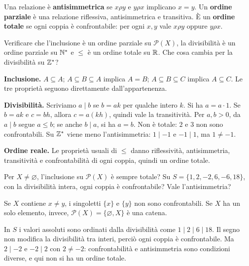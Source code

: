 \begin{definizione}
Una relazione è \textbf{antisimmetrica} se $x\rho y$ e $y\rho x$ implicano $x=y$. Un \textbf{ordine parziale} è una relazione riflessiva, antisimmetrica e transitiva. È un \textbf{ordine totale} se ogni coppia è confrontabile: per ogni $x,y$ vale $x\rho y$ oppure $y\rho x$.
\end{definizione}

\begin{esercizio}
Verificare che l'inclusione è un ordine parziale su $\mathcal P(X)$, la divisibilità è un ordine parziale su $\mathbb{N}^*$ e $\le$ è un ordine totale su $\mathbb{R}$. Che cosa cambia per la divisibilità su $\mathbb{Z}^*$?
\end{esercizio}
\begin{svolgimento}
\textbf{Inclusione.} $A\subseteq A$; $A\subseteq B\subseteq A$ implica $A=B$; $A\subseteq B\subseteq C$ implica $A\subseteq C$. Le tre proprietà seguono direttamente dall'appartenenza.

\textbf{Divisibilità.} Scriviamo $a\mid b$ se $b=ak$ per qualche intero $k$. Si ha $a=a\cdot1$. Se $b=ak$ e $c=bh$, allora $c=a(kh)$, quindi vale la transitività. Per $a,b>0$, da $a\mid b$ segue $a\le b$; se anche $b\mid a$, si ha $a=b$. Non è totale: $2$ e $3$ non sono confrontabili. Su $\mathbb{Z}^*$ viene meno l'antisimmetria: $1\mid-1$ e $-1\mid1$, ma $1\ne-1$.

\textbf{Ordine reale.} Le proprietà usuali di $\le$ danno riflessività, antisimmetria, transitività e confrontabilità di ogni coppia, quindi un ordine totale.
\end{svolgimento}

\begin{esercizio}[Confrontabilità]
Per $X\ne\varnothing$, l'inclusione su $\mathcal P(X)$ è sempre totale? Su $S=\{1,2,-2,6,-6,18\}$, con la divisibilità intera, ogni coppia è confrontabile? Vale l'antisimmetria?
\end{esercizio}
\begin{svolgimento}
Se $X$ contiene $x\ne y$, i singoletti $\{x\}$ e $\{y\}$ non sono confrontabili. Se $X$ ha un solo elemento, invece, $\mathcal P(X)=\{\varnothing,X\}$ è una catena.

In $S$ i valori assoluti sono ordinati dalla divisibilità come $1\mid2\mid6\mid18$. Il segno non modifica la divisibilità tra interi, perciò ogni coppia è confrontabile. Ma $2\mid-2$ e $-2\mid2$ con $2\ne-2$: confrontabilità e antisimmetria sono condizioni diverse, e qui non si ha un ordine totale.
\end{svolgimento}

